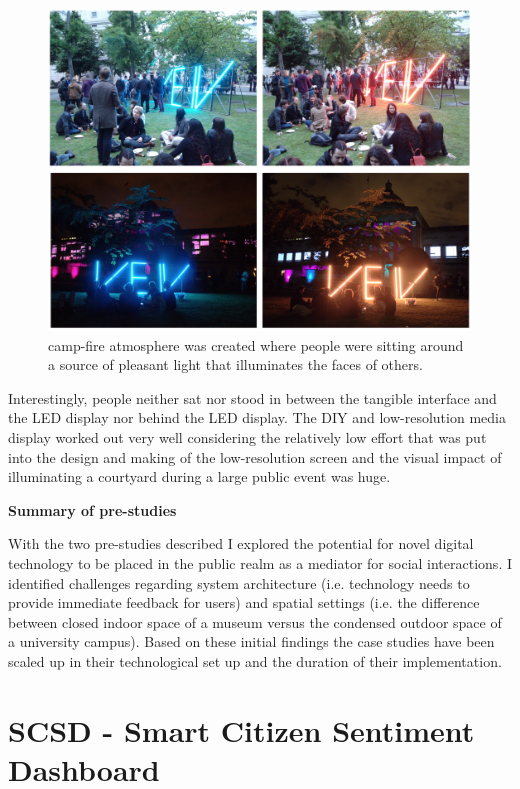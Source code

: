 \begin{figure}[!h] 
\centering
\includegraphics[width=\textwidth]{Illustrations/VEIVcampfire.png}
\caption [Campfire atmosphere] {camp-fire atmosphere was created where people were sitting around a source of pleasant light that illuminates the faces of others.}
\label{VEIVcampfire}
\end{figure}

Interestingly, people neither sat nor stood in between the tangible interface and the LED display nor behind the LED display.
The DIY and low-resolution media display worked out very well considering the relatively low effort that was put into the design and making of the low-resolution screen and the visual impact of illuminating a courtyard during a large public
event was huge. 

\textbf{Summary of pre-studies}

With the two pre-studies described I explored the potential for novel digital technology to be placed in the public realm as a mediator for social interactions. I identified challenges regarding system architecture (i.e. technology needs to provide immediate feedback for users) and spatial settings (i.e. the difference between closed indoor space of a museum versus the condensed outdoor space of a university campus).
Based on these initial findings the case studies have been scaled up in their technological set up and the duration of their implementation.  

\section{SCSD - Smart Citizen Sentiment Dashboard }

